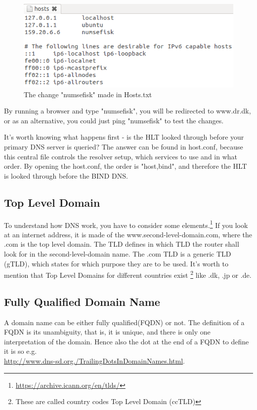 \begin{figure}[ht!]
\centering
\includegraphics[width=150mm]{img/hostsText.png}
\caption{The change "numsefisk" made in Hosts.txt}
\label{hostsText}
\end{figure}

By running a browser and type "numsefisk", you will be redirected to www.dr.dk, or as an alternative, you could just ping "numsefisk" to test the changes.

It's worth knowing what happens first - is the HLT looked through before your primary DNS server is queried?
The answer can be found in host.conf, because this central file controls the resolver setup, which services to use and in what order. By opening the host.conf, the order is "host,bind", and therefore the HLT is looked through before the BIND DNS.


\subsection{Top Level Domain}
To understand how DNS work, you have to consider some elements.\footnote{\url{https://archive.icann.org/en/tlds/}} If you look at an internet address, it is made of the www.second-level-domain.com, where the .com is the top level domain. The TLD defines in which TLD the router shall look for in the second-level-domain name.
The .com TLD is a generic TLD (gTLD), which states for which purpose they are to be used. It's worth to mention that Top Level Domains for different countries exist \footnote{These are called country codes Top Level Domain (ccTLD)} like .dk, .jp or .de.

\subsection{Fully Qualified Domain Name}
A domain name can be either fully qualified(FQDN) or not. The definition of a FQDN is its unambiguity, that is, it is unique, and there is only one interpretation of the domain. Hence also the dot at the end of a FQDN to define it is so e.g. \\ \url{http://www.dns-sd.org./TrailingDotsInDomainNames.html}.


